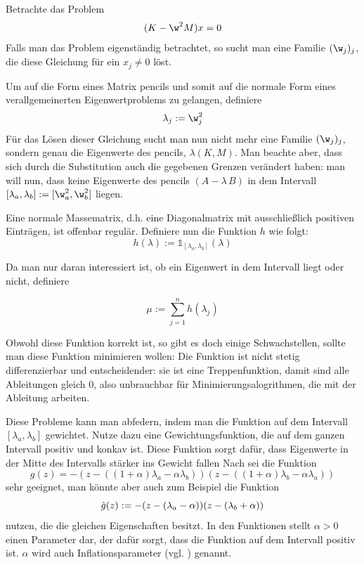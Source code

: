 \documentclass[a4paper,12pt]{report}
\newcommand{\zitat}[1]{\glqq #1 \grqq}
\newcommand{\AlamB}{A-\lambda\,B}
\newcommand{\1}{\mathds{1}}
\theoremstyle{plain} %
\theoremstyle{definition} %
\theoremstyle{remark}
\begin{document}
            Betrachte das Problem
            $$(K-\w^2 M)x = 0$$
            Falls man das Problem eigenständig betrachtet, so sucht man eine Familie $(\w_j)_j$, die diese Gleichung für ein $x_j \ne 0$ löst.

            Um auf die Form eines Matrix pencils und somit auf die normale Form eines verallgemeinerten Eigenwertproblems zu gelangen, definiere
            $$\lambda_j := \w_j^2$$
            Für das Lösen dieser Gleichung sucht man nun nicht mehr eine Familie $(\w_j)_j$, sondern genau die Eigenwerte des pencils, $\lambda(K,M)$.
            Man beachte aber, dass sich durch die Substitution auch die gegebenen Grenzen verändert haben:
            man will nun, dass keine Eigenwerte des pencils $(\AlamB)$ in dem Intervall $[\lambda_a, \lambda_b]:=[\w_a^2,\w^2_b]$ liegen.

            Eine normale Massematrix, d.h. eine Diagonalmatrix mit ausschließlich positiven Einträgen, ist offenbar regulär.
            Definiere nun die Funktion $h$ wie folgt:
            $$h(\lambda):=\1_{[\lambda_a,\lambda_b]}(\lambda)$$

            Da man nur daran interessiert ist, ob ein Eigenwert in dem Intervall liegt oder nicht, definiere

            $$\mu := \sum_{j=1}^{n} h(\lambda_j)$$

            Obwohl diese Funktion korrekt ist, so gibt es doch einige Schwachstellen, sollte man diese Funktion minimieren wollen:
            Die Funktion ist nicht stetig differenzierbar und entscheidender: sie ist eine Treppenfunktion, damit sind alle Ableitungen gleich 0, also unbrauchbar für Minimierungsalogrithmen, die mit der Ableitung arbeiten.

            Diese Probleme kann man abfedern, indem man die Funktion auf dem Intervall $[\lambda_a, \lambda_b]$ gewichtet.
            Nutze dazu eine Gewichtungsfunktion, die auf dem ganzen Intervall positiv und konkav ist.
            Diese Funktion sorgt dafür, dass Eigenwerte in der Mitte des Intervalls stärker ins Gewicht fallen
            Nach \cite[S. 3]{hauptteilTkachuk} sei die Funktion
            $$g(z) = -(z-((1+\alpha)\lambda_a -\alpha\lambda_b))(z-((1+\alpha)\lambda_b-\alpha\lambda_a))$$
            sehr geeignet, man könnte aber auch zum Beispiel die Funktion
            $$\Hat g(z) := -(z-(\lambda_a-\alpha))(z-(\lambda_b+\alpha))$$
            nutzen, die die gleichen Eigenschaften besitzt.
            In den Funktionen stellt $\alpha>0$ einen Parameter dar, der dafür sorgt, dass die Funktion auf dem Intervall positiv ist.
            $\alpha$ wird auch \zitat{Inflationsparameter} (vgl. \cite[S. 3]{hauptteilTkachuk}) genannt.
\end{document}
